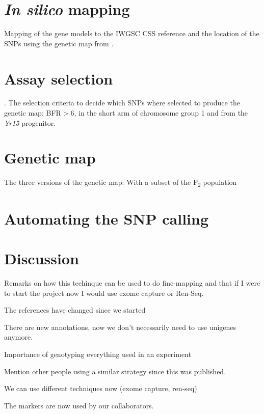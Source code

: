 \section{\textit{In silico} mapping}
Mapping of the gene models to the IWGSC CSS \citet{Mayer2014} reference and the location of the SNPs using the genetic map from \citet{Wang2014}.

\section{Assay selection}. 
The selection criteria to decide which SNPs where selected to produce the genetic map: BFR$>$6, in the short arm of chromosome group 1 and from the \textit{Yr15} progenitor.

\section{Genetic map} 
\label{yr15:geneticMap}
The three versions of the genetic map: With a subset of the F\textsubscript{2} population

\section{Automating the SNP calling}


\section{Discussion} 
Remarks on how this techinque can be used to do fine-mapping and that if I were to start the project now I would  use exome capture or Ren-Seq. 

The references have changed since we started

There are new annotations, now we don't necessarily need to use unigenes anymore. 

Importance of genotyping everything used in an experiment

Mention other people using a similar strategy since this was published. 

We can use different techniques now (exome capture, ren-seq)

The markers are now used by our collaborators. 